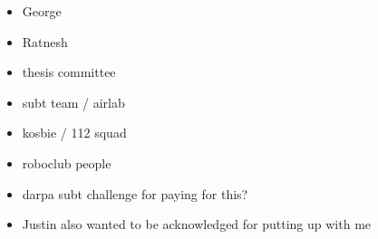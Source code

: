 \documentclass[12pt]{cmuthesis}
\begin{document}
\begin{acknowledgments}
\begin{itemize}
	\item George
	\item Ratnesh
	\item thesis committee
	\item subt team / airlab
	\item kosbie / 112 squad
	\item roboclub people
	\item darpa subt challenge for paying for this?
	\item Justin also wanted to be acknowledged for putting up with me
\end{itemize}
\end{acknowledgments}

\tableofcontents
\listoffigures
\listoftables

\mainmatter


%
%
%
%
%







%

\backmatter


\renewcommand{\bibsection}{\chapter{\bibname}}

\end{document}
